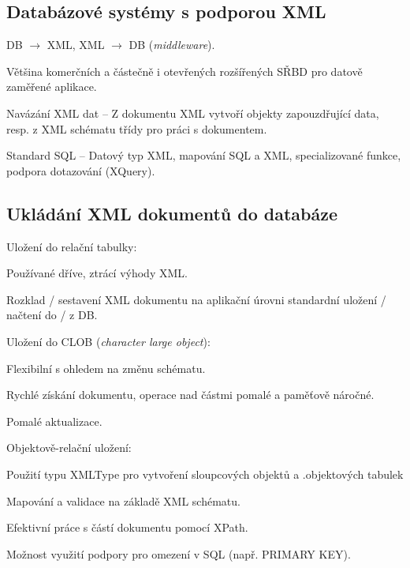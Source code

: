\subsection{Databázové systémy s podporou XML}

\begin{compactitem}
    \item DB $\rightarrow$ XML, XML $\rightarrow$ DB (\textit{middleware}).
    \item Většina komerčních a částečně i otevřených rozšířených SŘBD pro datově zaměřené aplikace.
    \item Navázání XML dat -- Z dokumentu XML vytvoří objekty zapouzdřující data, resp. z XML schématu třídy pro práci s dokumentem.
    \item Standard SQL -- Datový typ XML, mapování SQL a XML, specializované funkce, podpora dotazování (XQuery).
\end{compactitem}

\subsection{Ukládání XML dokumentů do databáze}

\begin{compactitem}
    \item Uložení do relační tabulky: \begin{compactitem}
        \item Používané dříve, ztrácí výhody XML.
        \item Rozklad / sestavení XML dokumentu na aplikační úrovni standardní uložení / načtení do / z DB.
    \end{compactitem}
    \item Uložení do CLOB (\textit{character large object}): \begin{compactitem}
        \item Flexibilní s ohledem na změnu schématu.
        \item Rychlé získání dokumentu, operace nad částmi pomalé a paměťově náročné.
        \item Pomalé aktualizace.
    \end{compactitem}
    \item Objektově-relační uložení: \begin{compactitem}
        \item Použití typu XMLType pro vytvoření sloupcových objektů a .objektových tabulek
        \item Mapování a validace na základě XML schématu.
        \item Efektivní práce s částí dokumentu pomocí XPath.
        \item Možnost využití podpory pro omezení v SQL (např. PRIMARY KEY).
    \end{compactitem}
\end{compactitem}

